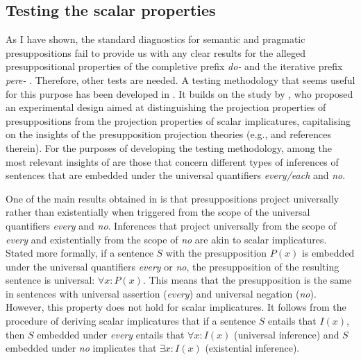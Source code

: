\subsection{Testing the scalar properties}\label{sec:chemla}
As I have shown, the standard diagnostics for semantic and pragmatic presuppositions fail to provide us with any clear results for the alleged presuppositional properties of the completive  prefix \textit{do-}   and the iterative prefix \textit{pere-}  . Therefore, other tests are needed. A testing methodology that seems useful for this purpose has been developed in \citealt{ZinovaFilip:SALT}. It builds on the study by \citet{Chemla:09}, who proposed an experimental design aimed at distinguishing the projection properties of presuppositions from the projection properties of scalar implicatures, capitalising on the insights of the presupposition projection theories (e.g., \citealp{Heim:83, Schlenker:08} and references therein). For the purposes of developing the testing methodology, among the most relevant insights of \citet{Chemla:09} are those that concern different types of inferences of sentences that are embedded under the universal quantifiers \textit{every/each} and \textit{no}.

One of the main results obtained in \citealt{Chemla:09} is that presuppositions project universally rather than existentially when triggered from the scope of the universal quantifiers \textit{every} and \textit{no}. Inferences that project universally from the scope of \textit{every} and existentially from the scope of \textit{no} are akin to scalar implicatures. Stated more formally, if a sentence $S$ with the presupposition $P(x)$ is embedded under the universal quantifiers \textit{every} or \textit{no}, the presupposition of the resulting sentence is universal: $\forall x: P(x)$. This means that the presupposition is the same in sentences with universal assertion (\textit{every}) and universal negation (\textit{no}). However, this property does not hold for scalar implicatures. It follows from the procedure of deriving scalar implicatures that if a sentence $S$ entails that $I(x)$, then $S$ embedded under \textit{every} entails that $\forall x: I(x)$ (universal inference) and $S$ embedded under \textit{no} implicates that $\exists x: I(x)$ (existential inference).

